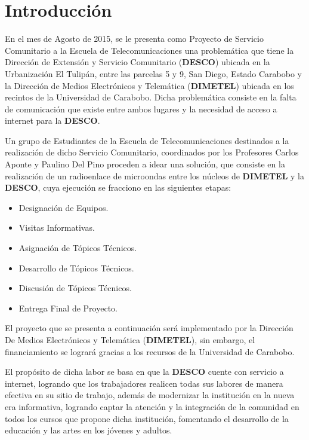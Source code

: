 \documentclass[11pt, a4paper, twosides]{report}
\begin{document}
{\pagestyle{plain}
\tableofcontents
\newpage
\listoffigures
\newpage 
\listoftables
\cleardoublepage}

\chapter{Introducción}
En el mes de Agosto de 2015, se le presenta como Proyecto de Servicio Comunitario a la Escuela de Telecomunicaciones una problemática que tiene la Dirección de Extensión y Servicio Comunitario (\textbf{DESCO}) ubicada en la Urbanización El Tulipán, entre las parcelas 5 y 9, San Diego, Estado Carabobo y la Dirección de Medios Electrónicos y Telemática (\textbf{DIMETEL}) ubicada en los recintos de la Universidad de Carabobo. Dicha problemática consiste en la falta de comunicación que existe entre ambos lugares y la necesidad de acceso a internet para la \textbf{DESCO}.

Un grupo de Estudiantes de la Escuela de Telecomunicaciones destinados a la realización de dicho Servicio Comunitario, coordinados por los Profesores Carlos Aponte y Paulino Del Pino proceden a idear una solución, que consiste en la realización de un radioenlace de microondas entre los núcleos de \textbf{DIMETEL} y la \textbf{DESCO}, cuya ejecución se fracciono en las siguientes etapas:

\begin{itemize}
    \item Designación de Equipos.
    \item Visitas Informativas.
    \item Asignación de Tópicos Técnicos.
    \item Desarrollo de Tópicos Técnicos.
    \item Discusión de Tópicos Técnicos.
    \item Entrega Final de Proyecto.
\end{itemize}

El proyecto que se presenta a continuación será implementado por la Dirección De Medios Electrónicos y Telemática (\textbf{DIMETEL}), sin embargo, el financiamiento se logrará gracias a los recursos de la Universidad de Carabobo.

El propósito de dicha labor se basa en que la \textbf{DESCO} cuente con servicio a internet, logrando que los trabajadores realicen todas sus labores de manera efectiva en su sitio de trabajo, además de modernizar la institución en la nueva era informativa, logrando captar la atención y la integración de la comunidad en todos los cursos que propone dicha institución, fomentando el desarrollo de la educación y las artes en los jóvenes y adultos.
\end{document}
